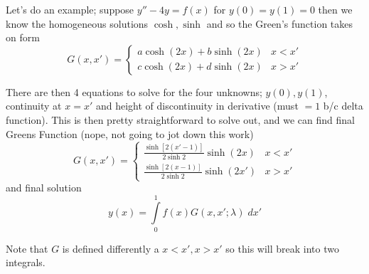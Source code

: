 \documentclass[10pt]{report}
\begin{document}
Let's do an example; suppose $y'' - 4y = f(x)$ for $y(0) = y(1) = 0$ then we know the homogeneous solutions $\cosh, \sinh$ and so the Green's function takes on form
\begin{equation}
    G(x,x') = \begin{cases}a\cosh(2x) + b\sinh(2x) & x <  x'\\
        c\cosh(2x) + d\sinh(2x) & x > x'\end{cases}
\end{equation}

There are then 4 equations to solve for the four unknowns; $y(0), y(1)$, continuity at $x=x'$ and height of discontinuity in derivative (must $=1$ b/c delta function). This is then pretty straightforward to solve out, and we can find final Greens Function (nope, not going to jot down this work)
\begin{equation}
    G(x,x') = \begin{cases} \frac{\sinh\left[ 2\left( x' - 1 \right) \right]}{2\sinh2}\sinh(2x) & x<x'\\
        \frac{\sinh\left[ 2\left( x-1 \right) \right]}{2\sinh 2} \sinh(2x') & x>x'\end{cases}
\end{equation}
and final solution
\begin{equation}
    y(x) = \displaystyle\int\limits_{0}^{1}f(x)G(x,x';\lambda)\;dx'
\end{equation}

Note that $G$ is defined differently a $x<x', x > x'$ so this will break into two integrals.
\end{document}
